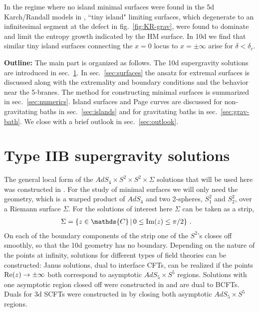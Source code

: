 \documentclass[aps,prd,11pt,notitlepage,longbibliography,nofootinbib,tightenlines,preprintnumbers]{revtex4-1}
\def\Im{\mathop{\rm Im}}
\def\Re{\mathop{\rm Re}}
\begin{document}
In the regime where no island minimal surfaces were found in the 5d Karch/Randall models in \cite{Geng:2020fxl}, ``tiny island"
limiting surfaces, which degenerate to an infinitesimal segment at the defect in fig.~\ref{fig:KR-grav}, were found to dominate and limit the entropy growth indicated by the HM surface.
%
In 10d we find that similar tiny island surfaces connecting the $x=0$ locus to $x=\pm\infty$ arise for $\delta<\delta_c$.


\medskip 
\textbf{Outline:} 
The main part is organized as follows.
The 10d supergravity solutions are introduced in sec.~\ref{sec:IIBsol}.
In sec.~\ref{sec:surfaces} the ansatz for extremal surfaces is discussed along with the extremality and boundary conditions and the behavior near the 5-branes.
The method for constructing minimal surfaces is summarized in sec.~\ref{sec:numerics}.
%
Island surfaces and Page curves are discussed for non-gravitating baths  in sec.~\ref{sec:islands} and for gravitating baths in sec.~\ref{sec:grav-bath}. We close with a brief outlook in sec.~\ref{sec:outlook}.



\section{Type IIB supergravity solutions}\label{sec:IIBsol}

The general local form of the $AdS_4\times S^2\times S^2\times \Sigma$ solutions that will be used here was constructed in \cite{DHoker:2007zhm,DHoker:2007hhe}. 
For the study of minimal surfaces we will only need the geometry, which is a warped product of $AdS_4$ and two 2-spheres, $S_1^2$ and $S_2^2$, over a Riemann surface $\Sigma$.
For the solutions of interest here $\Sigma$ can be taken as a strip, 
\begin{align}
	\Sigma&=\lbrace z\in\mathds{C}\,\vert\, 0\leq \Im(z)\leq \pi/2\rbrace~.
\end{align}
On each of the boundary components of the strip one of the $S^2$'s closes off smoothly, so that the 10d geometry has no boundary.
Depending on the nature of the points at infinity, solutions for different types of field theories can be constructed: 
Janus solutions, dual to interface CFTs, can be realized if the points $\Re(z)\rightarrow \pm\infty$ both correspond to asymptotic $AdS_5\times S^5$ regions.
Solutions with one asymptotic region closed off were constructed in \cite{Aharony:2011yc} and are dual to BCFTs.
Duals for 3d SCFTs were constructed in \cite{Assel:2011xz} by closing both asymptotic $AdS_5\times S^5$ regions.
\end{document}
